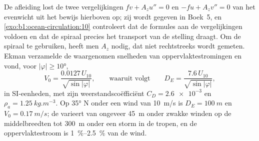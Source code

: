 De afleiding lost de twee vergelijkingen $f v + A_z u'' = 0$ en $-f u + A_z v'' =
0$ van het evenwicht uit het bewijs hierboven op; zij wordt gegeven in Boek~5, en
\cref{exo:b1:ocean-circulation:10} controleert dat de formules aan de vergelijkingen voldoen
en dat de spiraal precies het transport van de stelling draagt. Om de spiraal te gebruiken, heeft men $A_z$ nodig, dat niet rechtstreeks wordt gemeten. Ekman verzamelde de
waargenomen snelheden van oppervlaktestromingen en vond, voor $|\varphi| \geq \ang{10}$,
\[
  V_0 = \frac{0.0127\,U_{10}}{\sqrt{\sin|\varphi|}},
  \qquad\text{waaruit volgt}\qquad
  D_E = \frac{7.6\,U_{10}}{\sqrt{\sin|\varphi|}},
\]
in SI-eenheden, met zijn weerstandscoëfficiënt $C_D = \num{2.6e-3}$ en $\rho_a =
\qty{1.25}{kg.m^{-3}}$. Op \ang{35} N onder een wind van \qty{10}{m/s} is $D_E =
\qty{100}{m}$ en $V_0 = \qty{0.17}{m/s}$; de  varieert van ongeveer
\qty{45}{m} onder zwakke winden op de middelbreedten tot \qty{300}{m} onder een storm in de tropen, en de oppervlaktestroom is \qtyrange{1}{2.5}{\percent} van de wind.

